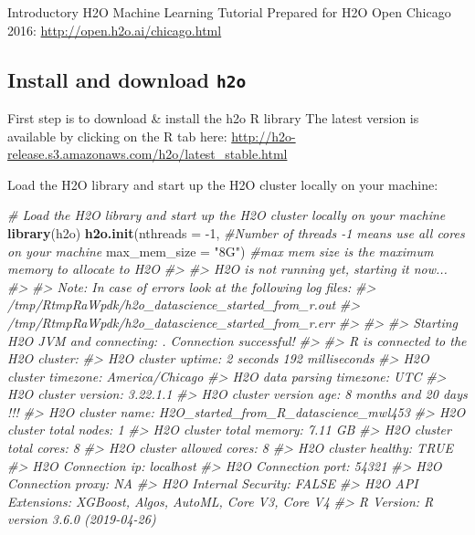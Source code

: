 \documentclass[]{book}
\newenvironment{Shaded}{\begin{snugshade}}{\end{snugshade}}
\newcommand{\CommentTok}[1]{\textcolor[rgb]{0.56,0.35,0.01}{\textit{#1}}}
\newcommand{\DataTypeTok}[1]{\textcolor[rgb]{0.13,0.29,0.53}{#1}}
\newcommand{\DecValTok}[1]{\textcolor[rgb]{0.00,0.00,0.81}{#1}}
\newcommand{\KeywordTok}[1]{\textcolor[rgb]{0.13,0.29,0.53}{\textbf{#1}}}
\newcommand{\NormalTok}[1]{#1}
\newcommand{\StringTok}[1]{\textcolor[rgb]{0.31,0.60,0.02}{#1}}
\begin{document}
Introductory H2O Machine Learning Tutorial
Prepared for H2O Open Chicago 2016: \url{http://open.h2o.ai/chicago.html}

\hypertarget{install-and-download-h2o}{%
\subsection{\texorpdfstring{Install and download \texttt{h2o}}{Install and download h2o}}\label{install-and-download-h2o}}

First step is to download \& install the h2o R library
The latest version is available by clicking on the R tab here: \url{http://h2o-release.s3.amazonaws.com/h2o/latest_stable.html}

Load the H2O library and start up the H2O cluster locally on your machine:

\begin{Shaded}
\begin{Highlighting}[]
\CommentTok{# Load the H2O library and start up the H2O cluster locally on your machine}
\KeywordTok{library}\NormalTok{(h2o)}
\KeywordTok{h2o.init}\NormalTok{(}\DataTypeTok{nthreads =} \DecValTok{-1}\NormalTok{, }\CommentTok{#Number of threads -1 means use all cores on your machine}
         \DataTypeTok{max_mem_size =} \StringTok{"8G"}\NormalTok{)  }\CommentTok{#max mem size is the maximum memory to allocate to H2O}
\CommentTok{#> }
\CommentTok{#> H2O is not running yet, starting it now...}
\CommentTok{#> }
\CommentTok{#> Note:  In case of errors look at the following log files:}
\CommentTok{#>     /tmp/RtmpRaWpdk/h2o_datascience_started_from_r.out}
\CommentTok{#>     /tmp/RtmpRaWpdk/h2o_datascience_started_from_r.err}
\CommentTok{#> }
\CommentTok{#> }
\CommentTok{#> Starting H2O JVM and connecting: . Connection successful!}
\CommentTok{#> }
\CommentTok{#> R is connected to the H2O cluster: }
\CommentTok{#>     H2O cluster uptime:         2 seconds 192 milliseconds }
\CommentTok{#>     H2O cluster timezone:       America/Chicago }
\CommentTok{#>     H2O data parsing timezone:  UTC }
\CommentTok{#>     H2O cluster version:        3.22.1.1 }
\CommentTok{#>     H2O cluster version age:    8 months and 20 days !!! }
\CommentTok{#>     H2O cluster name:           H2O_started_from_R_datascience_mwl453 }
\CommentTok{#>     H2O cluster total nodes:    1 }
\CommentTok{#>     H2O cluster total memory:   7.11 GB }
\CommentTok{#>     H2O cluster total cores:    8 }
\CommentTok{#>     H2O cluster allowed cores:  8 }
\CommentTok{#>     H2O cluster healthy:        TRUE }
\CommentTok{#>     H2O Connection ip:          localhost }
\CommentTok{#>     H2O Connection port:        54321 }
\CommentTok{#>     H2O Connection proxy:       NA }
\CommentTok{#>     H2O Internal Security:      FALSE }
\CommentTok{#>     H2O API Extensions:         XGBoost, Algos, AutoML, Core V3, Core V4 }
\CommentTok{#>     R Version:                  R version 3.6.0 (2019-04-26)}
\end{Highlighting}
\end{Shaded}
\end{document}

